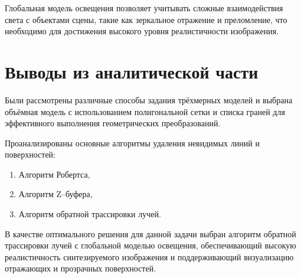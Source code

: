 Глобальная модель освещения позволяет учитывать сложные взаимодействия света с объектами сцены, такие как зеркальное отражение и преломление, что необходимо для достижения высокого уровня реалистичности изображения.

\section{Выводы из аналитической части}

Были рассмотрены различные способы задания трёхмерных моделей и выбрана объёмная модель с использованием полигональной сетки и списка граней для эффективного выполнения геометрических преобразований.

Проанализированы основные алгоритмы удаления невидимых линий и поверхностей:
\begin{enumerate}[label=\arabic*)]
	\item Алгоритм Робертса,
	\item Алгоритм Z--буфера,
	\item Алгоритм обратной трассировки лучей.
\end{enumerate}

В качестве оптимального решения для данной задачи выбран алгоритм обратной трассировки лучей с глобальной моделью освещения, обеспечивающий высокую реалистичность синтезируемого изображения и поддерживающий визуализацию отражающих и прозрачных поверхностей.

\newpage
\clearpage
